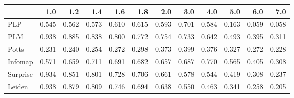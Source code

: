 \begin{tabular}{lrrrrrrrrrrr}
\toprule
{} &   1.0 &   1.2 &   1.4 &   1.6 &   1.8 &   2.0 &   3.0 &   4.0 &   5.0 &   6.0 &   7.0 \\
\midrule
PLP      & 0.545 & 0.562 & 0.573 & 0.610 & 0.615 & 0.593 & 0.701 & 0.584 & 0.163 & 0.059 & 0.058 \\
PLM      & 0.938 & 0.885 & 0.838 & 0.800 & 0.772 & 0.754 & 0.733 & 0.642 & 0.493 & 0.395 & 0.311 \\
Potts    & 0.231 & 0.240 & 0.254 & 0.272 & 0.298 & 0.373 & 0.399 & 0.376 & 0.327 & 0.272 & 0.228 \\
Infomap  & 0.571 & 0.659 & 0.711 & 0.691 & 0.682 & 0.657 & 0.687 & 0.770 & 0.565 & 0.405 & 0.308 \\
Surprise & 0.934 & 0.851 & 0.801 & 0.728 & 0.706 & 0.661 & 0.578 & 0.544 & 0.419 & 0.308 & 0.237 \\
Leiden   & 0.938 & 0.879 & 0.809 & 0.746 & 0.694 & 0.638 & 0.550 & 0.463 & 0.341 & 0.258 & 0.205 \\
\bottomrule
\end{tabular}
